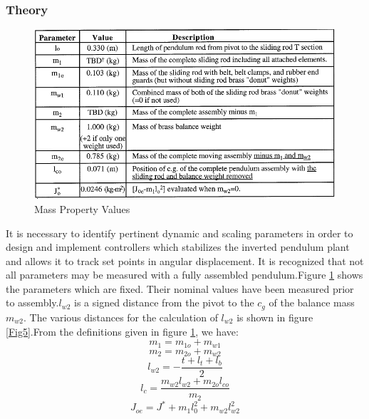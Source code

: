 \documentclass[12pt, a4paper]{article}
\begin{document}
\subsubsection{Theory}
\begin{figure}[H]
\centering
\includegraphics[width = \textwidth]{masspropertyvalues.png}
\caption{Mass Property Values}
\label{Fig4}
\end{figure}
It is necessary to identify pertinent dynamic and scaling parameters in order to design and implement controllers which stabilizes the inverted pendulum plant and allows it to track set points in angular displacement. It is recognized that not all parameters may be measured with a fully assembled pendulum.Figure \ref{Fig4} shows the parameters which are fixed. Their nominal values have been measured prior to assembly.$l_{w2}$ is a signed distance from the pivot to the $c_g$ of the balance mass $m_{w2}$. The various distances for the calculation of $l_{w2}$ is shown in figure \ref{Fig5}.From the definitions given in figure \ref{Fig4}, we have:
\begin{equation}\label{eq:23}
m_1 = m_{1o} + m_{w1}
\end{equation}
\begin{equation}\label{eq:24}
m_2 = m_{2o} + m_{w2}
\end{equation}
\begin{equation}\label{eq:25}
l_{w2} = -\frac{t + l_t + l_b}{2}
\end{equation}
\begin{equation}\label{eq:26}
l_c = \frac{m_{w2}l_{w2} + m_{2o}l_{co}}{m_2}
\end{equation}
\begin{equation}\label{eq:27}
J_{oe} = J^* + m_1l_0^2 + m_{w2}l_{w2}^2
\end{equation}
\end{document}
